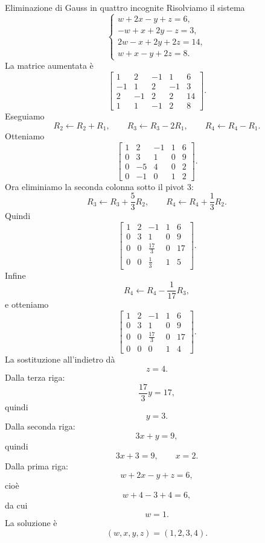 \documentclass[a4paper]{article}
\begin{document}
\begin{snippetexample}{Eliminazione di Gauss in quattro incognite}
    Risolviamo il sistema
    \[
        \begin{cases}
            w+2x-y+z=6,\\
            -w+x+2y-z=3,\\
            2w-x+2y+2z=14,\\
            w+x-y+2z=8.
        \end{cases}
    \]
    La matrice aumentata è
    \[
        \left[
            \begin{array}{rrrr|r}
                1 & 2 & -1 & 1 & 6\\
                -1 & 1 & 2 & -1 & 3\\
                2 & -1 & 2 & 2 & 14\\
                1 & 1 & -1 & 2 & 8
            \end{array}
        \right].
    \]
    Eseguiamo
    \[
        R_2\leftarrow R_2+R_1,
        \qquad
        R_3\leftarrow R_3-2R_1,
        \qquad
        R_4\leftarrow R_4-R_1.
    \]
    Otteniamo
    \[
        \left[
            \begin{array}{rrrr|r}
                1 & 2 & -1 & 1 & 6\\
                0 & 3 & 1 & 0 & 9\\
                0 & -5 & 4 & 0 & 2\\
                0 & -1 & 0 & 1 & 2
            \end{array}
        \right].
    \]
    Ora eliminiamo la seconda colonna sotto il pivot \(3\):
    \[
        R_3\leftarrow R_3+\frac{5}{3}R_2,
        \qquad
        R_4\leftarrow R_4+\frac{1}{3}R_2.
    \]
    Quindi
    \[
        \left[
            \begin{array}{rrrr|r}
                1 & 2 & -1 & 1 & 6\\
                0 & 3 & 1 & 0 & 9\\
                0 & 0 & \frac{17}{3} & 0 & 17\\
                0 & 0 & \frac{1}{3} & 1 & 5
            \end{array}
        \right].
    \]
    Infine
    \[
        R_4\leftarrow R_4-\frac{1}{17}R_3,
    \]
    e otteniamo
    \[
        \left[
            \begin{array}{rrrr|r}
                1 & 2 & -1 & 1 & 6\\
                0 & 3 & 1 & 0 & 9\\
                0 & 0 & \frac{17}{3} & 0 & 17\\
                0 & 0 & 0 & 1 & 4
            \end{array}
        \right].
    \]
    La sostituzione all'indietro dà
    \[
        z=4.
    \]
    Dalla terza riga:
    \[
        \frac{17}{3}y=17,
    \]
    quindi
    \[
        y=3.
    \]
    Dalla seconda riga:
    \[
        3x+y=9,
    \]
    quindi
    \[
        3x+3=9,
        \qquad
        x=2.
    \]
    Dalla prima riga:
    \[
        w+2x-y+z=6,
    \]
    cioè
    \[
        w+4-3+4=6,
    \]
    da cui
    \[
        w=1.
    \]
    La soluzione è
    \[
        (w,x,y,z)=(1,2,3,4).
    \]
\end{snippetexample}
\end{document}
